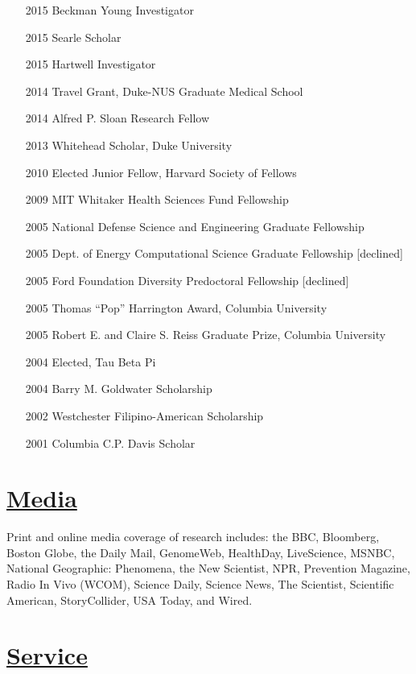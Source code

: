 \documentclass[overlapped,line,11pt]{res}
\begin{document}
\begin{resume}
\begin{itemize}[leftmargin=1cm, style=sameline, itemsep=0mm]
\item[2015] Beckman Young Investigator
\item[2015] Searle Scholar
\item[2015] Hartwell Investigator
\item[2014] Travel Grant, Duke-NUS Graduate Medical School
\item[2014] Alfred P. Sloan Research Fellow %
\item[2013] Whitehead Scholar, Duke University%
\item[2010] Elected Junior Fellow, Harvard Society of Fellows%
\item[2009] MIT Whitaker Health Sciences Fund Fellowship %
\item[2005] National Defense Science and Engineering Graduate
  Fellowship
\item[2005] Dept. of Energy Computational Science Graduate Fellowship [declined]
\item[2005] Ford Foundation Diversity Predoctoral Fellowship [declined]
\item[2005] Thomas ``Pop'' Harrington Award, Columbia University
\item[2005] Robert E. and Claire S. Reiss Graduate Prize, Columbia University
\item[2004] Elected, Tau Beta Pi
\item[2004] Barry M. Goldwater Scholarship
\item[2002] Westchester Filipino-American Scholarship
\item[2001] Columbia C.P. Davis Scholar

\end{itemize}

\section{\underline{\sc Media}} 
\vspace{.05in} Print and online media coverage of research includes:
the BBC, Bloomberg, Boston Globe, the Daily Mail, GenomeWeb,
HealthDay, LiveScience, MSNBC, National Geographic: Phenomena, the New
Scientist, NPR, Prevention Magazine, Radio In Vivo (WCOM), Science Daily, Science News, The
Scientist, Scientific American, StoryCollider, USA Today, and Wired.


\section{\underline{\sc Service}}
\vspace{.05in}


\end{resume}
\end{document}
